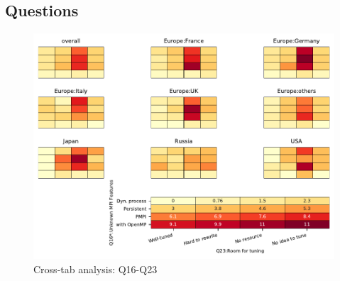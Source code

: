 
\subsection{Questions}


\begin{figure}
\begin{center}
\includegraphics[width=12cm]{../pdfs/Q16-Q23.pdf}
\caption{Cross-tab analysis: Q16-Q23}
\label{fig:Q16-Q23}
\end{center}
\end{figure}
